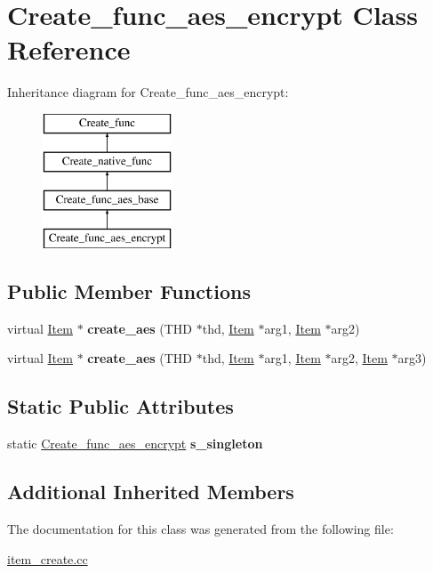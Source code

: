 \hypertarget{classCreate__func__aes__encrypt}{}\section{Create\+\_\+func\+\_\+aes\+\_\+encrypt Class Reference}
\label{classCreate__func__aes__encrypt}
Inheritance diagram for Create\+\_\+func\+\_\+aes\+\_\+encrypt\+:\begin{figure}[H]
\begin{center}
\leavevmode
\includegraphics[height=4.000000cm]{classCreate__func__aes__encrypt}
\end{center}
\end{figure}
\subsection*{Public Member Functions}
\begin{DoxyCompactItemize}
\item 
\mbox{\label{classCreate__func__aes__encrypt_a37ee4fe649c5fb4f648eeb86f296356b}} 
virtual \mbox{\hyperlink{classItem}{Item}} $\ast$ {\bfseries create\+\_\+aes} (T\+HD $\ast$thd, \mbox{\hyperlink{classItem}{Item}} $\ast$arg1, \mbox{\hyperlink{classItem}{Item}} $\ast$arg2)
\item 
\mbox{\label{classCreate__func__aes__encrypt_aee2b8ede8476243b8732bb901f69858a}} 
virtual \mbox{\hyperlink{classItem}{Item}} $\ast$ {\bfseries create\+\_\+aes} (T\+HD $\ast$thd, \mbox{\hyperlink{classItem}{Item}} $\ast$arg1, \mbox{\hyperlink{classItem}{Item}} $\ast$arg2, \mbox{\hyperlink{classItem}{Item}} $\ast$arg3)
\end{DoxyCompactItemize}
\subsection*{Static Public Attributes}
\begin{DoxyCompactItemize}
\item 
\mbox{\label{classCreate__func__aes__encrypt_a7a8ef3111b92f7efd6a0f8f3b47c3ff7}} 
static \mbox{\hyperlink{classCreate__func__aes__encrypt}{Create\+\_\+func\+\_\+aes\+\_\+encrypt}} {\bfseries s\+\_\+singleton}
\end{DoxyCompactItemize}
\subsection*{Additional Inherited Members}


The documentation for this class was generated from the following file\+:\begin{DoxyCompactItemize}
\item 
\mbox{\hyperlink{item__create_8cc}{item\+\_\+create.\+cc}}\end{DoxyCompactItemize}
